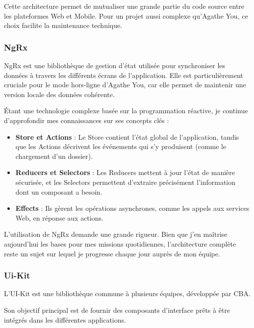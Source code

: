 \documentclass{article}
\begin{document}
Cette architecture permet de mutualiser une grande partie du code source entre les plateformes Web et Mobile. Pour un projet aussi complexe qu'Agathe You, ce choix facilite la maintenance technique.

\subsubsection{NgRx}

NgRx est une bibliothèque de gestion d'état utilisée pour synchroniser les données à travers les différents écrans de l'application. Elle est particulièrement cruciale pour le mode hors-ligne d'Agathe You, car elle permet de maintenir une version locale des données cohérente.

Étant une technologie complexe basée sur la programmation réactive, je continue d'approfondir mes connaissances sur ses concepts clés :

\begin{itemize}
    \item \textbf{Store et Actions} : Le Store contient l'état global de l'application, tandis que les Actions décrivent les événements qui s'y produisent (comme le chargement d'un dossier).
    
    \item \textbf{Reducers et Selectors} : Les Reducers mettent à jour l'état de manière sécurisée, et les Selectors permettent d'extraire précisément l'information dont un composant a besoin.
    
    \item \textbf{Effects} : Ils gèrent les opérations asynchrones, comme les appels aux services Web, en réponse aux actions.
\end{itemize}

L'utilisation de NgRx demande une grande rigueur. Bien que j'en maîtrise aujourd'hui les bases pour mes missions quotidiennes, l'architecture complète reste un sujet sur lequel je progresse chaque jour auprès de mon équipe.

\subsubsection{Ui-Kit}

L'UI-Kit est une bibliothèque commune à plusieurs équipes, développée par CBA.

Son objectif principal est de fournir des composants d'interface prêts à être intégrés dans les différentes applications.
\end{document}

